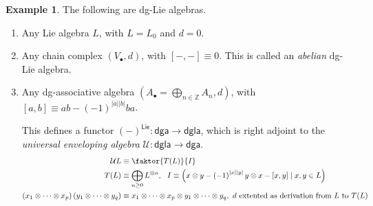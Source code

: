 \documentclass[10pt,letterpaper,cm]{nupset}
\theoremstyle{definition}
\newtheorem{exmp}[defn]{Example}
\theoremstyle{theorem}
\theoremstyle{remark}
\newcommand{\U}{\mathcal U}
\newcommand{\Z}{\mathbb Z}
\newcommand{\1}{\mathbb{1}}
\newcommand{\0}{\vec 0}
\newcommand{\be}{\begin{enumerate}}
\newcommand{\ee}{\end{enumerate}}
\begin{document}
\begin{exmp} The following are dg-Lie algebras.
\be
\item Any Lie algebra $L$, with $L = L_0$ and $d =0$.
\item Any chain complex $\left(V_{\bullet}, d\right)$, with $\left[{-}, {-}\right] \equiv 0$. This is called an \textit{abelian} dg-Lie algebra.
\item Any dg-associative algebra $\left( A_{\bullet} = \bigoplus_{n \in \Z} A_n, d\right)$, with $\left[a,b\right] \equiv ab - \left({-1}\right)^{\left\lvert{a}\right\rvert \left\lvert{b}\right\rvert}ba$.

This defines a functor $\left({-}\right)^{\mathsf{Lie}} : \mathsf{dga} \to \mathsf{dgla}$,  which is right adjoint to the \textit{universal enveloping algebra} $\U : \mathsf{dgla} \to \mathsf{dga}$.
\begin{align*}
\U{L} &  \equiv \faktor{T(L)}{I}
\\ T(L) & \equiv \bigoplus_{n \geq 0}L^{\otimes n}, \ \ I  \equiv  \left(x \otimes y - \left({-1}\right)^{\left\lvert{x}\right\rvert \left\lvert{y}\right\rvert} y \otimes x - \left[x,y\right] \mid x, y \in L\right)
\\ \left(x_1 \otimes \cdots \otimes x_p\right) \left(y_1 \otimes \cdots \otimes y_q\right) & \equiv x_1 \otimes \cdots \otimes x_p \otimes y_1 \otimes \cdots \otimes y_q,\   \text{$d$ extented as derivation from $L$ to $T(L)$}
\end{align*}
\ee
\end{exmp}
\end{document}
